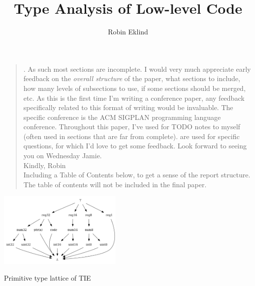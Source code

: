 \documentclass[10pt, a4paper, sigplan, authordraft]{acmart}
\title{Type Analysis of Low-level Code}
\author{Robin Eklind}
\affiliation{
	\institution{Royal Institute of Technology (KTH)}
	\city{Stockholm}
	\country{Sweden}
}
\begin{document}



\begin{quote}
. As such most sections are incomplete. I would very much appreciate early feedback on the \textit{overall structure} of the paper, what sections to include, how many levels of subsections to use, if some sections should be merged, etc. As this is the first time I'm writing a conference paper, any feedback specifically related to this format of writing would be invaluable. The specific conference is the ACM SIGPLAN programming language conference. Throughout this paper, I've used  for TODO notes to myself (often used in sections that are far from complete).  are used for specific questions, for which I'd love to get some feedback. Look forward to seeing you on Wednesday Jamie. \\
Kindly, Robin \\

Including a Table of Contents below, to get a sense of the report structure. The table of contents will not be included in the final paper.
\end{quote}

\tableofcontents

\clearpage


\begin{teaserfigure}
	\centering
	\includegraphics[width=0.45\textwidth]{inc/tie_primitive_type_lattice.png}
	\caption{Primitive type lattice of TIE}
	\label{fig:base_type_lattice}
\end{teaserfigure}

\end{document}
